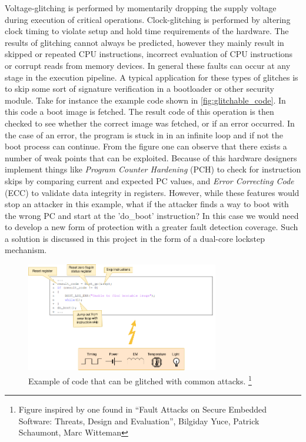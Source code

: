 Voltage-glitching is performed by momentarily dropping the supply voltage during execution of critical operations. Clock-glitching is performed by altering clock timing to violate setup and hold time requirements of the hardware\cite{intro_to_FI}. The results of glitching cannot always be predicted, however they mainly result in skipped or repeated CPU instructions, incorrect evaluation of CPU instructions or corrupt reads from memory devices\cite{intro_to_FI}. In general these faults can occur at any stage in the execution pipeline. A typical application for these types of glitches is to skip some sort of signature verification in a bootloader or other security module. Take for instance the example code shown in \autoref{fig:glitchable_code}. In this code a boot image is fetched. The result code of this operation is then checked to see whether the correct image was fetched, or if an error occurred. In the case of an error, the program is stuck in in an infinite loop and if not the boot process can continue. From the figure one can observe that there exists a number of weak points that can be exploited. Because of this hardware designers implement things like \textit{Program Counter Hardening} (PCH) to check for instruction skips by comparing current and expected PC values, and \textit{Error Correcting Code} (ECC) to validate data integrity in registers. However, while these features would stop an attacker in this example, what if the attacker finds a way to boot with the wrong PC and start at the 'do\_boot' instruction? In this case we would need to develop a new form of protection with a greater fault detection coverage. Such a solution is discussed in this project in the form of a dual-core lockstep mechanism. 

\begin{figure}[h!]
    \centering
    \includegraphics[width=0.75\textwidth]{docs/images/glitch_attack_whole_system.png}
    \caption{Example of code that can be glitched with common attacks. \footnote{Figure inspired by one found in “Fault Attacks on Secure Embedded Software:
Threats, Design and Evaluation”, Bilgiday Yuce, Patrick Schaumont,
Marc Witteman}}
    \label{fig:glitchable_code}
\end{figure}

